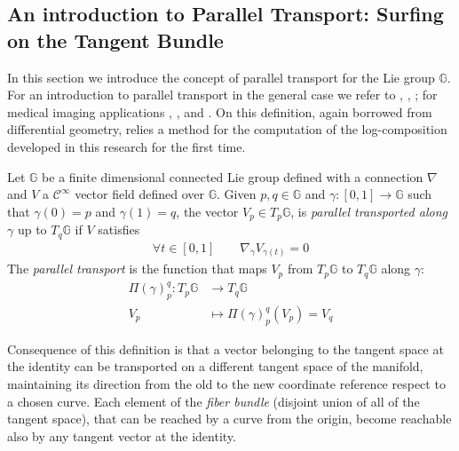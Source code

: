 \subsection{An introduction to Parallel Transport: Surfing on the Tangent Bundle}\label{se:parallel_transport}

In this section we introduce the concept of parallel transport for the Lie group $\mathbb{G}$. 
For an introduction to parallel transport in the general case we refer to \cite{misner1973gravitation}, \cite{knebelman1951spaces}, \cite{kheyfets2000schild}; for medical imaging applications \cite{lorenzi2011schild}, \cite{pennec2011parallel}, \cite{lorenzi2013geodesics} and \cite{lorenzi2014efficient}.
On this definition, again borrowed from differential geometry, relies a method for the computation of the log-composition developed in this research for the first time.
\begin{definition}
	Let $\mathbb{G}$ be a finite dimensional connected Lie group defined with a connection $\nabla$ and $V$ a $\mathcal{C}^{\infty}$ vector field defined over $\mathbb{G}$. Given $p,q \in \mathbb{G}$ and $\gamma : [0,1] \rightarrow \mathbb{G}$ such that $\gamma(0) = p$ and $\gamma(1) = q$, the vector $V_{p} \in T_{p}\mathbb{G}$, is \emph{parallel transported along $\gamma$} up to $T_{q}\mathbb{G}$ if $V$ satisfies
	\begin{align*}
	\forall t \in  [0,1]
	\qquad
	\nabla_{\dot{\gamma}}V_{\gamma(t)} = 0
	\end{align*}
	The \emph{parallel transport} is the function that maps $V_{p}$ from $T_{p}\mathbb{G}$ to $T_{q}\mathbb{G}$ along $\gamma$:
	\begin{align*}
	\Pi(\gamma)_{p}^{q} :  T_{p}\mathbb{G} & \longrightarrow T_{q}\mathbb{G}  \\
	V_{p}&\longmapsto \Pi(\gamma)_{p}^{q}(V_{p}) = V_{q}
	\end{align*}
\end{definition}

Consequence of this definition is that a vector belonging to the tangent space at the identity can be transported on a different tangent space of the manifold, maintaining its direction from the old to the new coordinate reference respect to a chosen curve. Each element of the \emph{fiber bundle} (disjoint union of all of the tangent space), that can be reached by a curve from the origin, become reachable also by any tangent vector at the identity.


